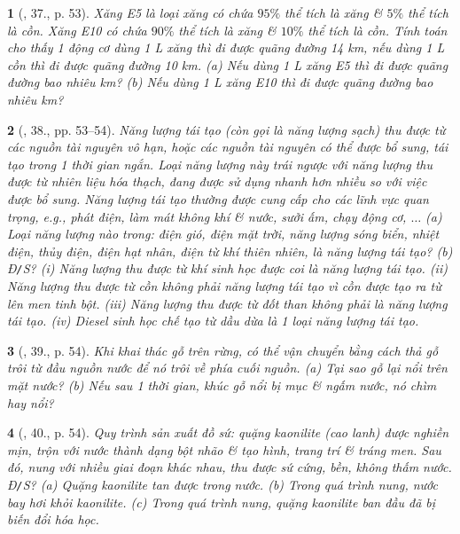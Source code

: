 \documentclass{article}
\newtheorem{baitoan}{}
\begin{document}
\begin{baitoan}[\cite{ncpt_KHTN_6_tap_1}, 37., p. 53]
	Xăng E5 là loại xăng có chứa $95\%$ thể tích là xăng \& $5\%$ thể tích là cồn. Xăng E10 có chứa $90\%$ thể tích là xăng \& $10\%$ thể tích là cồn. Tính toán cho thấy 1 động cơ dùng {\rm1 L} xăng thì đi được quãng đường {\rm14 km}, nếu dùng {\rm1 L} cồn thì đi được quãng đường {\rm10 km}. (a) Nếu dùng {\rm1 L} xăng E5 thì đi được quãng đường bao nhiêu {\rm km}? (b) Nếu dùng {\rm1 L} xăng E10 thì đi được quãng đường bao nhiêu {\rm km}?
\end{baitoan}

\begin{baitoan}[\cite{ncpt_KHTN_6_tap_1}, 38., pp. 53--54]
	{\rm Năng lượng tái tạo} (còn gọi là {\rm năng lượng sạch}) thu được từ các nguồn tài nguyên vô hạn, hoặc các nguồn tài nguyên có thể được bổ sung, tái tạo trong 1 thời gian ngắn. Loại năng lượng này trái ngược với năng lượng thu được từ nhiên liệu hóa thạch, đang được sử dụng nhanh hơn nhiều so với việc được bổ sung. Năng lượng tái tạo thường được cung cấp cho các lĩnh vực quan trọng, e.g., phát điện, làm mát không khí \& nước, sưởi ấm, chạy động cơ, $\ldots$ (a) Loại năng lượng nào trong: điện gió, điện mặt trời, năng lượng sóng biển, nhiệt điện, thủy điện, điện hạt nhân, điện từ khí thiên nhiên, là năng lượng tái tạo? (b) {\rm Đ{\tt/}S?} (i) Năng lượng thu được từ khí sinh học được coi là năng lượng tái tạo. (ii) Năng lượng thu được từ cồn không phải năng lượng tái tạo vì cồn được tạo ra từ lên men tinh bột. (iii) Năng lượng thu được từ đốt than không phải là năng lượng tái tạo. (iv) Diesel sinh học chế tạo từ dầu dừa là 1 loại năng lượng tái tạo.
\end{baitoan}

\begin{baitoan}[\cite{ncpt_KHTN_6_tap_1}, 39., p. 54]
	Khi khai thác gỗ trên rừng, có thể vận chuyển bằng cách thả gỗ trôi từ đầu nguồn nước để nó trôi về phía cuối nguồn. (a) Tại sao gỗ lại nổi trên mặt nước? (b) Nếu sau 1 thời gian, khúc gỗ nổi bị mục \& ngấm nước, nó chìm hay nổi?
\end{baitoan}

\begin{baitoan}[\cite{ncpt_KHTN_6_tap_1}, 40., p. 54]
	Quy trình sản xuất đồ sứ: quặng kaonilite (cao lanh) được nghiền mịn, trộn với nước thành dạng bột nhão \& tạo hình, trang trí \& tráng men. Sau đó, nung với nhiều giai đoạn khác nhau, thu được sứ cứng, bền, không thấm nước. {\rm Đ{\tt/}S?} (a) Quặng kaonilite tan được trong nước. (b) Trong quá trình nung, nước bay hơi khỏi kaonilite. (c) Trong quá trình nung, quặng kaonilite ban đầu đã bị biến đổi hóa học.
\end{baitoan}
\end{document}
